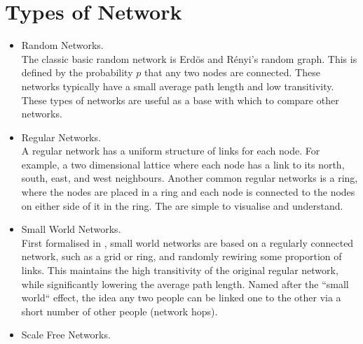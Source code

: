 

\section{Types of Network}


\begin{itemize}
  
  \item Random Networks.\\
    
    The classic basic random network is Erd{\"{o}}s and
    R{\'{e}}nyi's\cite{net-erdos59-random} random graph. This is defined by the
    probability $p$ that any two nodes are connected. These networks typically
    have a small average path length and low transitivity. These types of
    networks are useful as a base with which to compare other networks.

  \item Regular Networks.\\

    A regular network has a uniform structure of links for each node. For
    example, a two dimensional lattice where each node has a link to its north,
    south, east, and west neighbours. Another common regular networks is a ring,
    where the nodes are placed in a ring and each node is connected to the
    nodes on either side of it in the ring. The are simple to visualise and
    understand. 

  \item Small World Networks.\\
    
    First formalised in \cite{net-watts98-smallworld},
    small world networks are based on a regularly connected network, such as a
    grid or ring, and randomly rewiring some proportion of links. This
    maintains the high transitivity of the original regular network, while
    significantly lowering the average path length.  Named after the ``small
    world`` effect, the idea any two people can be linked one to the other
    via a short number of other people (network hops).
    
  \item Scale Free Networks.\\


\end{itemize}
